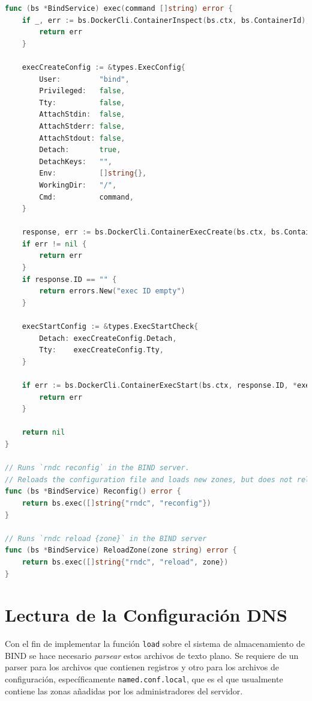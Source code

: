 \begin{lstlisting}[frame=single, language=Go, caption=Métodos para actualizar a BIND con los cambios en sus archivos.]
func (bs *BindService) exec(command []string) error {
    if _, err := bs.DockerCli.ContainerInspect(bs.ctx, bs.ContainerId); err != nil {
        return err
    }

    execCreateConfig := &types.ExecConfig{
        User:         "bind",
        Privileged:   false,
        Tty:          false,
        AttachStdin:  false,
        AttachStderr: false,
        AttachStdout: false,
        Detach:       true,
        DetachKeys:   "",
        Env:          []string{},
        WorkingDir:   "/",
        Cmd:          command,
    }

    response, err := bs.DockerCli.ContainerExecCreate(bs.ctx, bs.ContainerId, *execCreateConfig)
    if err != nil {
        return err
    }
    if response.ID == "" {
        return errors.New("exec ID empty")
    }

    execStartConfig := &types.ExecStartCheck{
        Detach: execCreateConfig.Detach,
        Tty:    execCreateConfig.Tty,
    }

    if err := bs.DockerCli.ContainerExecStart(bs.ctx, response.ID, *execStartConfig); err != nil {
        return err
    }

    return nil
}

// Runs `rndc reconfig` in the BIND server.
// Reloads the configuration file and loads new zones, but does not reload existing zone files even if they have changed.
func (bs *BindService) Reconfig() error {
    return bs.exec([]string{"rndc", "reconfig"})
}

// Runs `rndc reload {zone}` in the BIND server
func (bs *BindService) ReloadZone(zone string) error {
    return bs.exec([]string{"rndc", "reload", zone})
}
\end{lstlisting}

\section{Lectura de la Configuración DNS}

Con el fin de implementar la función \verb+load+ sobre el sistema de almacenamiento de BIND se hace necesario \textit{parsear} estos archivos de texto plano. Se requiere de un parser para los archivos que contienen registros y otro para los archivos de configuración, específicamente \verb+named.conf.local+, que es el que usualmente contiene las zonas añadidas por los administradores del servidor.


